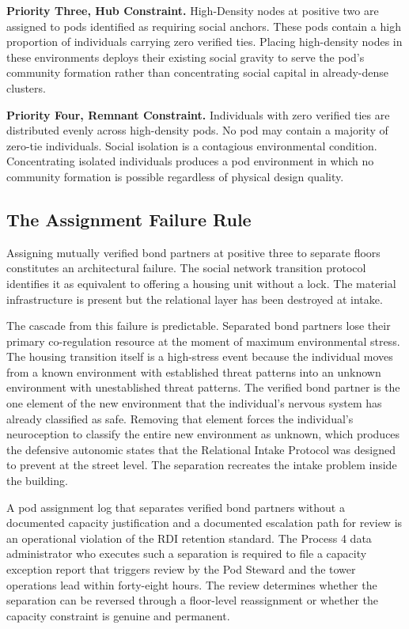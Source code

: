 \documentclass[12pt, letterpaper]{article}
\begin{document}
\textbf{Priority Three, Hub Constraint.} High-Density nodes at positive two are assigned to pods identified as requiring social anchors. These pods contain a high proportion of individuals carrying zero verified ties. Placing high-density nodes in these environments deploys their existing social gravity to serve the pod's community formation rather than concentrating social capital in already-dense clusters.

\textbf{Priority Four, Remnant Constraint.} Individuals with zero verified ties are distributed evenly across high-density pods. No pod may contain a majority of zero-tie individuals. Social isolation is a contagious environmental condition. Concentrating isolated individuals produces a pod environment in which no community formation is possible regardless of physical design quality.

\subsection{The Assignment Failure Rule}

Assigning mutually verified bond partners at positive three to separate floors constitutes an architectural failure. The social network transition protocol identifies it as equivalent to offering a housing unit without a lock. The material infrastructure is present but the relational layer has been destroyed at intake.

The cascade from this failure is predictable. Separated bond partners lose their primary co-regulation resource at the moment of maximum environmental stress. The housing transition itself is a high-stress event because the individual moves from a known environment with established threat patterns into an unknown environment with unestablished threat patterns. The verified bond partner is the one element of the new environment that the individual's nervous system has already classified as safe. Removing that element forces the individual's neuroception to classify the entire new environment as unknown, which produces the defensive autonomic states that the Relational Intake Protocol was designed to prevent at the street level. The separation recreates the intake problem inside the building.

A pod assignment log that separates verified bond partners without a documented capacity justification and a documented escalation path for review is an operational violation of the RDI retention standard. The Process 4 data administrator who executes such a separation is required to file a capacity exception report that triggers review by the Pod Steward and the tower operations lead within forty-eight hours. The review determines whether the separation can be reversed through a floor-level reassignment or whether the capacity constraint is genuine and permanent.
\end{document}
